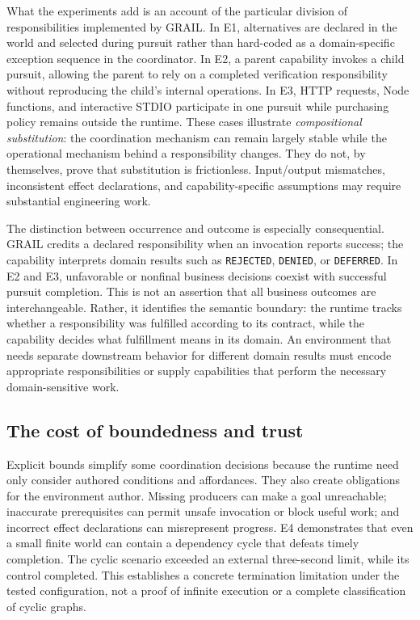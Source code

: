 \documentclass[11pt]{article}
\begin{document}
What the experiments add is an account of the particular division of responsibilities implemented by GRAIL. In E1, alternatives are declared in the world and selected during pursuit rather than hard-coded as a domain-specific exception sequence in the coordinator. In E2, a parent capability invokes a child pursuit, allowing the parent to rely on a completed verification responsibility without reproducing the child's internal operations. In E3, HTTP requests, Node functions, and interactive STDIO participate in one pursuit while purchasing policy remains outside the runtime. These cases illustrate \emph{compositional substitution}: the coordination mechanism can remain largely stable while the operational mechanism behind a responsibility changes. They do not, by themselves, prove that substitution is frictionless. Input/output mismatches, inconsistent effect declarations, and capability-specific assumptions may require substantial engineering work.

The distinction between occurrence and outcome is especially consequential. GRAIL credits a declared responsibility when an invocation reports success; the capability interprets domain results such as \texttt{REJECTED}, \texttt{DENIED}, or \texttt{DEFERRED}. In E2 and E3, unfavorable or nonfinal business decisions coexist with successful pursuit completion. This is not an assertion that all business outcomes are interchangeable. Rather, it identifies the semantic boundary: the runtime tracks whether a responsibility was fulfilled according to its contract, while the capability decides what fulfillment means in its domain. An environment that needs separate downstream behavior for different domain results must encode appropriate responsibilities or supply capabilities that perform the necessary domain-sensitive work.

\subsection{The cost of boundedness and trust}
Explicit bounds simplify some coordination decisions because the runtime need only consider authored conditions and affordances. They also create obligations for the environment author. Missing producers can make a goal unreachable; inaccurate prerequisites can permit unsafe invocation or block useful work; and incorrect effect declarations can misrepresent progress. E4 demonstrates that even a small finite world can contain a dependency cycle that defeats timely completion. The cyclic scenario exceeded an external three-second limit, while its control completed. This establishes a concrete termination limitation under the tested configuration, not a proof of infinite execution or a complete classification of cyclic graphs.
\end{document}

